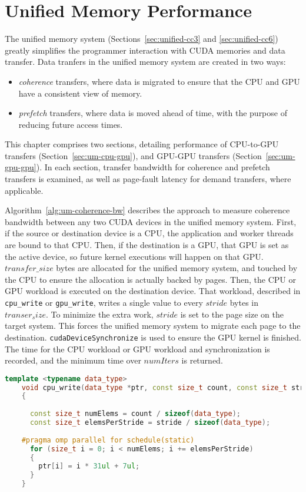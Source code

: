 \chapter{Unified Memory Performance}
\label{ch:unified}

The unified memory system (Sections~\ref{sec:unified-cc3} and \ref{sec:unified-cc6}) greatly simplifies the programmer interaction with CUDA memories and data transfer.
Data tranfers in the unified memory system are created in two ways:
\begin{itemize}
    \item \textit{coherence} transfers, where data is migrated to ensure that the CPU and GPU have a consistent view of memory.
    \item \textit{prefetch} transfers, where data is moved ahead of time, with the purpose of reducing future access times. 
\end{itemize}
This chapter comprises two sections, detailing performance of CPU-to-GPU transfers (Section~\ref{sec:um-cpu-gpu}), and GPU-GPU transfers (Section~\ref{sec:um-gpu-gpu}).
In each section, transfer bandwidth for coherence and prefetch transfers is examined, as well as page-fault latency for demand transfers, where applicable.

Algorithm~\ref{alg:um-coherence-bw} describes the approach to measure coherence bandwidth between any two CUDA devices in the unified memory system.
First, if the source or destination device is a CPU, the application and worker threads are bound to that CPU.
Then, if the destination is a GPU, that GPU is set as the active device, so future kernel executions will happen on that GPU.
$transfer\_size$ bytes are allocated for the unified memory system, and touched by the CPU to ensure the allocation is actually backed by pages.
Then, the CPU or GPU workload is executed on the destination device.
That workload, described in \texttt{cpu\_write} or \texttt{gpu\_write}, writes a single value to every $stride$ bytes in $transer_size$.
To minimize the extra work, $stride$ is set to the page size on the target system.
This forces the unified memory system to migrate each page to the destination.
\texttt{cudaDeviceSynchronize} is used to ensure the GPU kernel is finished.
The time for the CPU workload or GPU workload and synchronization is recorded, and the minimum time over $numIters$ is returned.

\begin{lstlisting}[language=c++, caption=CPU Write Function, label=lst:cpu-write]
    template <typename data_type>
    void cpu_write(data_type *ptr, const size_t count, const size_t stride)
    {
    
      const size_t numElems = count / sizeof(data_type);
      const size_t elemsPerStride = stride / sizeof(data_type);
    
    #pragma omp parallel for schedule(static)
      for (size_t i = 0; i < numElems; i += elemsPerStride)
      {
        ptr[i] = i * 31ul + 7ul;
      }
    }
\end{lstlisting}

